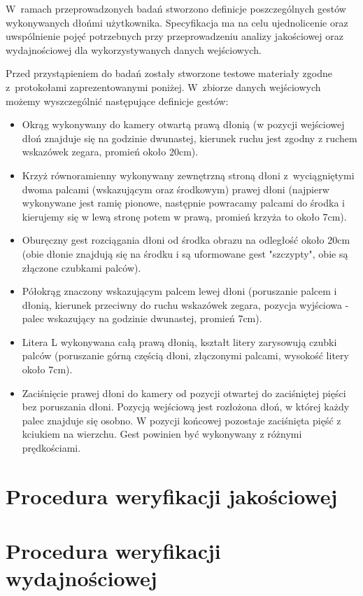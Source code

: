 W~ramach przeprowadzonych badań stworzono definicje poszczególnych gestów wykonywanych dłońmi użytkownika. Specyfikacja ma na celu ujednolicenie oraz uwspólnienie pojęć potrzebnych przy przeprowadzeniu analizy jakościowej oraz wydajnościowej dla wykorzystywanych danych wejściowych.

Przed przystąpieniem do badań zostały stworzone testowe materiały zgodne z~protokołami zaprezentowanymi poniżej. W~zbiorze danych wejściowych możemy wyszczególnić następujące definicje gestów:

\begin{itemize}
  \item Okrąg wykonywany do kamery otwartą prawą dłonią (w pozycji wejściowej dłoń znajduje się na godzinie dwunastej, kierunek ruchu jest zgodny z ruchem wskazówek zegara, promień około 20cm).
  \item Krzyż równoramienny wykonywany zewnętrzną stroną dłoni z~wyciągniętymi dwoma palcami (wskazującym oraz środkowym) prawej dłoni (najpierw wykonywane jest ramię pionowe, następnie powracamy palcami do środka i kierujemy się w lewą stronę potem w prawą, promień krzyża to około 7cm).
  \item Oburęczny gest rozciągania dłoni od środka obrazu na odległość około 20cm (obie dłonie znajdują się na środku i są uformowane gest "szczypty", obie są złączone czubkami palców).
  \item Półokrąg znaczony wskazującym palcem lewej dłoni (poruszanie palcem i dłonią, kierunek przeciwny do ruchu wskazówek zegara, pozycja wyjściowa - palec wskazujący na godzinie dwunastej, promień 7cm).
  \item Litera L wykonywana całą prawą dłonią, kształt litery zarysowują czubki palców (poruszanie górną częścią dłoni, złączonymi palcami, wysokość litery około 7cm).
  \item Zaciśnięcie prawej dłoni do kamery od pozycji otwartej do zaciśniętej pięści bez poruszania dłoni. Pozycją wejściową jest rozłożona dłoń, w której każdy palec znajduje się osobno. W pozycji końcowej pozostaje zaciśnięta pięść z kciukiem na wierzchu. Gest powinien być wykonywany z różnymi prędkościami.
\end{itemize}

\section{Procedura weryfikacji jakościowej}\label{Section_ProceduraWeryfikacjiJakosciowej}

\section{Procedura weryfikacji wydajnościowej}\label{Section_ProceduraWeryfikacjiWydajnosciowej}

